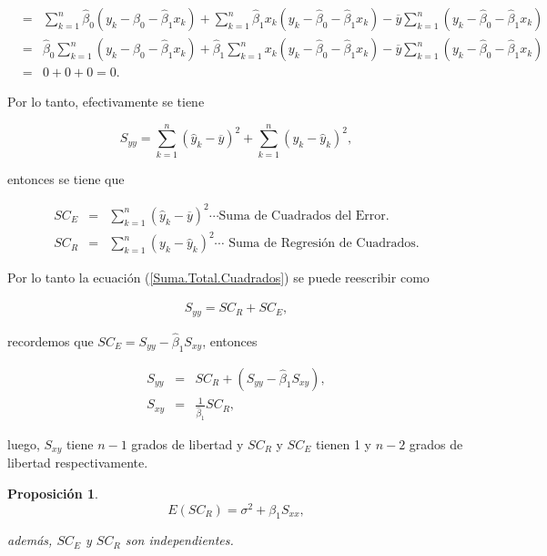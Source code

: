 \documentclass[12pt]{article}
\newtheorem{Prop}{Proposici\'on}%
\begin{document}
\begin{eqnarray*}
&=&\sum_{k=1}^{n}\hat{\beta}_{0}\left(y_{k}-\hat{\beta}_{0}-\hat{\beta}_{1}x_{k}\right)+\sum_{k=1}^{n}\hat{\beta}_{1}x_{k}\left(y_{k}-\hat{\beta}_{0}-\hat{\beta}_{1}x_{k}\right)-\overline{y}\sum_{k=1}^{n}\left(y_{k}-\hat{\beta}_{0}-\hat{\beta}_{1}x_{k}\right)\\
&=&\hat{\beta}_{0}\sum_{k=1}^{n}\left(y_{k}-\hat{\beta}_{0}-\hat{\beta}_{1}x_{k}\right)+\hat{\beta}_{1}\sum_{k=1}^{n}x_{k}\left(y_{k}-\hat{\beta}_{0}-\hat{\beta}_{1}x_{k}\right)-\overline{y}\sum_{k=1}^{n}\left(y_{k}-\hat{\beta}_{0}-\hat{\beta}_{1}x_{k}\right)\\
&=&0+0+0=0.
\end{eqnarray*}


Por lo tanto, efectivamente se tiene

\begin{equation}\label{Suma.Total.Cuadrados}
S_{yy}=\sum_{k=1}^{n}\left(\hat{y}_{k}-\overline{y}\right)^{2}+\sum_{k=1}^{n}\left(y_{k}-\hat{y}_{k}\right)^{2},
\end{equation}

entonces se tiene que 

\begin{eqnarray*}
SC_{E}&=&\sum_{k=1}^{n}\left(\hat{y}_{k}-\overline{y}\right)^{2}\cdots\textrm{Suma de Cuadrados del Error}.\\
SC_{R}&=&\sum_{k=1}^{n}\left(y_{k}-\hat{y}_{k}\right)^{2}\cdots\textrm{ Suma de Regresi\'on de Cuadrados}.
\end{eqnarray*}

Por lo tanto la ecuaci\'on (\ref{Suma.Total.Cuadrados}) se puede reescribir como 

\begin{eqnarray*}%
S_{yy}=SC_{R}+SC_{E},
\end{eqnarray*}

recordemos que $SC_{E}=S_{yy}-\hat{\beta}_{1}S_{xy}$, entonces

\begin{eqnarray*}
S_{yy}&=&SC_{R}+\left( S_{yy}-\hat{\beta}_{1}S_{xy}\right),\\
S_{xy}&=&\frac{1}{\hat{\beta}_{1}}SC_{R},
\end{eqnarray*}

luego, $S_{xy}$ tiene $n-1$ grados de libertad y $SC_{R}$ y $SC_{E}$ tienen 1 y $n-2$ grados de libertad respectivamente.

\begin{Prop}
\begin{equation}
E\left(SC_{R}\right)=\sigma^{2}+\beta_{1}S_{xx},
\end{equation}

adem\'as, $SC_{E}$ y $SC_{R}$ son independientes.

\end{Prop}
\end{document}

